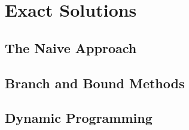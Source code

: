 \chapter{Exact Solutions}

\section{The Naive Approach}

\section{Branch and Bound Methods}

\section{Dynamic Programming}